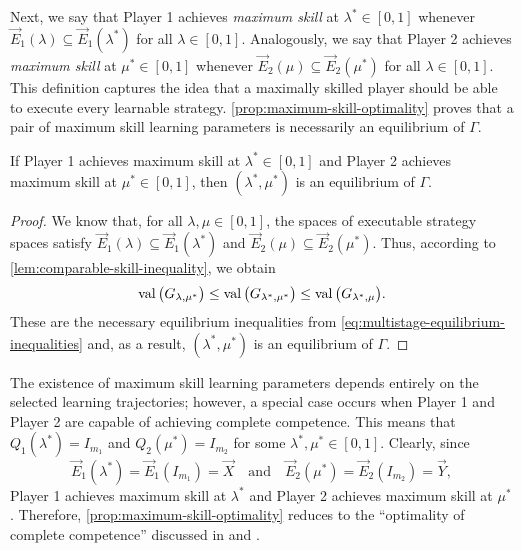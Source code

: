     Next, we say that Player 1 achieves \emph{maximum skill} at $\lambda^* \in [0, 1]$ whenever $\vec{E}_1(\lambda) \subseteq \vec{E}_1(\lambda^*)$ for all $\lambda \in [0, 1]$.
    Analogously, we say that Player 2 achieves \emph{maximum skill} at $\mu^* \in [0, 1]$ whenever $\vec{E}_2(\mu) \subseteq \vec{E}_2(\mu^*)$ for all $\lambda \in [0, 1]$.
    This definition captures the idea that a maximally skilled player should be able to execute every learnable strategy.
    \autoref{prop:maximum-skill-optimality} proves that a pair of maximum skill learning parameters is necessarily an equilibrium of $\Gamma$.

    \begin{proposition} \label{prop:maximum-skill-optimality}
        If Player 1 achieves maximum skill at $\lambda^* \in [0, 1]$ and Player 2 achieves maximum skill at $\mu^* \in [0, 1]$, then $(\lambda^*, \mu^*)$ is an equilibrium of $\Gamma$.
    \end{proposition}

    \begin{proof}
        We know that, for all $\lambda, \mu \in [0, 1]$, the spaces of executable strategy spaces satisfy $\vec{E}_1(\lambda) \subseteq \vec{E}_1(\lambda^*)$ and $\vec{E}_2(\mu) \subseteq \vec{E}_2(\mu^*)$.
        Thus, according to \autoref{lem:comparable-skill-inequality}, we obtain
        \[
            \operatorname{val}\big(G_{\lambda, \mu^*}\big)
                \le \operatorname{val}\big(G_{\lambda^*, \mu^*}\big)
                \le \operatorname{val}\big(G_{\lambda^*, \mu}\big).
        \]
        These are the necessary equilibrium inequalities from \eqref{eq:multistage-equilibrium-inequalities} and, as a result, $(\lambda^*, \mu^*)$ is an equilibrium of $\Gamma$.
    \end{proof}

    The existence of maximum skill learning parameters depends entirely on the selected learning trajectories; however, a special case occurs when Player 1 and Player 2 are capable of achieving complete competence.
    This means that $Q_1(\lambda^*) = I_{m_1}$ and $Q_2(\mu^*) = I_{m_2}$ for some $\lambda^*, \mu^* \in [0, 1]$.
    Clearly, since
    \[
        \vec{E}_1(\lambda^*)
            = \vec{E}_1(I_{m_1})
            = \vec{X}
        \quad\text{and}\quad
        \vec{E}_2(\mu^*)
            = \vec{E}_2(I_{m_2})
            = \vec{Y},
    \]
    Player 1 achieves maximum skill at $\lambda^*$ and Player 2 achieves maximum skill at $\mu^*$.
    Therefore, \autoref{prop:maximum-skill-optimality} reduces to the ``optimality of complete competence'' discussed in \parencite[Section 4.4]{Beck2007} and \parencite[Proposition 3.1]{Beck2013}.